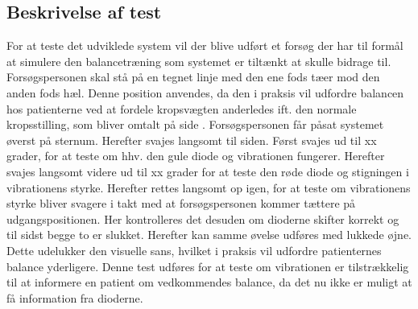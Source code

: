 \subsection{Beskrivelse af test}
For at teste det udviklede system vil der blive udført et forsøg der har til formål at simulere den balancetræning som systemet er tiltænkt at skulle bidrage til.
Forsøgspersonen skal stå på en tegnet linje med den ene fods tæer mod den anden fods hæl. Denne position anvendes, da den i praksis vil udfordre balancen hos patienterne ved at fordele kropsvægten anderledes ift. den normale kropsstilling, som bliver omtalt på side \pageref{BalanceAfsnit}. 
Forsøgspersonen får påsat systemet øverst på sternum. Herefter svajes langsomt til siden. Først svajes ud til xx grader, for at teste om hhv. den gule diode og vibrationen fungerer. Herefter svajes langsomt videre ud til xx grader for at teste den røde diode og stigningen i vibrationens styrke. Herefter rettes langsomt op igen, for at teste om vibrationens styrke bliver svagere i takt med at forsøgspersonen kommer tættere på udgangspositionen. Her kontrolleres det desuden om dioderne skifter korrekt og til sidst begge to er slukket. Herefter kan samme øvelse udføres med lukkede øjne. Dette udelukker den visuelle sans, hvilket i praksis vil udfordre patienternes balance yderligere. Denne test udføres for at teste om vibrationen er tilstrækkelig til at informere en patient om vedkommendes balance, da det nu ikke er muligt at få information fra dioderne. \\

